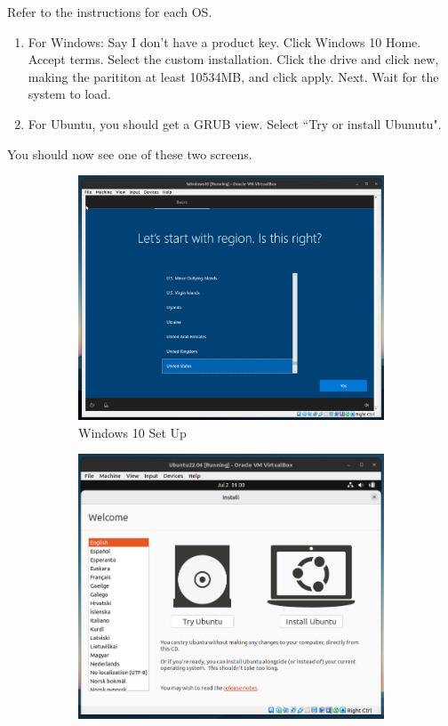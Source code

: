   Refer to the instructions for each OS. 
  \begin{enumerate}
      \item For Windows: Say I don't have a product key. Click Windows 10 Home. Accept terms. Select the custom installation. Click the drive and click new, making the parititon at least 10534MB, and click apply. Next. Wait for the system to load. 
      \item For Ubuntu, you should get a GRUB view. Select ``Try or install Ubunutu". 
  \end{enumerate}
  You should now see one of these two screens. 
  \begin{figure}[hbt!]
      \centering 
      \begin{subfigure}[b]{0.45\textwidth}
      \centering
          \includegraphics[width=\textwidth]{img/VM_Windows2.png}
          \caption{Windows 10 Set Up}
          \label{fig:VM_Windows2}
      \end{subfigure}
      \hfill 
      \begin{subfigure}[b]{0.45\textwidth}
      \centering
          \includegraphics[width=\textwidth]{img/VM_Ubuntu2.png}

\end{subfigure}
\end{figure}
